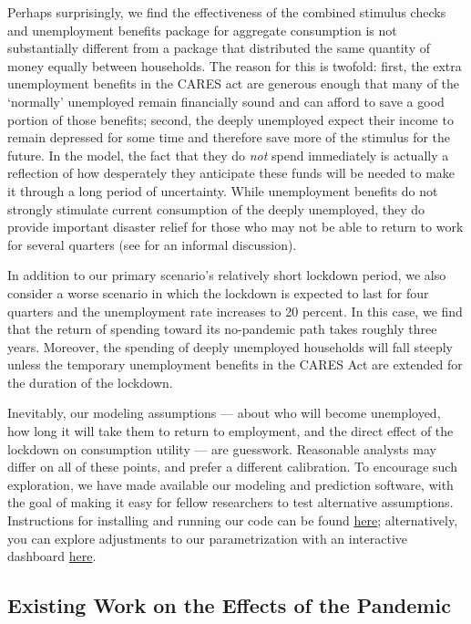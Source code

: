 \documentclass[titlepage]{\econtex}
\begin{document}
Perhaps surprisingly, we find the effectiveness of the combined stimulus checks and unemployment benefits package for aggregate consumption is not substantially different from a package that distributed the same quantity of money equally between households.
The reason for this is twofold: first, the extra unemployment benefits in the CARES act are generous enough that many of the `normally' unemployed remain financially sound and can afford to save a good portion of those benefits; second, the deeply unemployed expect their income to remain depressed for some time and therefore save more of the stimulus for the future.  In the model, the fact that they do \textit{not} spend immediately is actually a reflection of how desperately they anticipate these funds will be needed to make it through a long period of uncertainty.
While unemployment benefits do not strongly stimulate current consumption of the deeply unemployed, they do provide important disaster relief for those who may not be able to return to work for several quarters (see \cite{krugman_corona} for an informal discussion).

In addition to our primary scenario's relatively short lockdown period, we also consider a worse scenario in which the lockdown is expected to last for four quarters and the unemployment rate increases to 20 percent.
In this case, we find that the return of spending toward its no-pandemic path takes roughly three years. Moreover, the spending of deeply unemployed households will fall steeply unless the temporary unemployment benefits in the CARES Act are extended for the duration of the lockdown.  

Inevitably, our modeling assumptions --- about who will become unemployed, how long it will take them to return to employment, and the direct effect of the lockdown on consumption utility --- are guesswork.
Reasonable analysts may differ on all of these points, and prefer a different calibration.
To encourage such exploration, we have made available our modeling and prediction software, with the goal of making it easy for fellow researchers to test alternative assumptions.  Instructions for installing and running our code can be found \href{https://github.com/econ-ark/Pandemic#reproduction-instructions}{here}; alternatively, you can explore adjustments to our parametrization with an interactive dashboard \href{http://www.google.com}{here}.

\subsection*{Existing Work on the Effects of the Pandemic}
\end{document}
